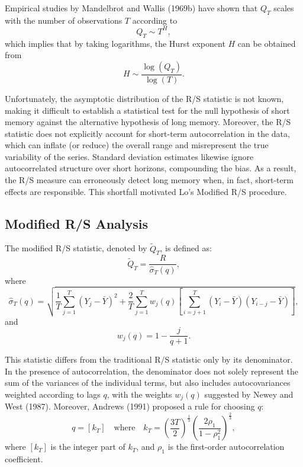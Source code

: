 \documentclass[11pt]{extarticle}
\begin{document}
Empirical studies by Mandelbrot and Wallis (1969b) have shown that \(Q_T\) scales with the number of observations \(T\) according to
\begin{equation}
    Q_T \sim T^H,
\end{equation}
which implies that by taking logarithms, the Hurst exponent \(H\) can be obtained from
\begin{equation}
    H \sim \frac{\log(Q_T)}{\log(T)}.
\end{equation}

Unfortunately, the asymptotic distribution of the R/S statistic is not known, making it difficult to establish a
statistical test for the null hypothesis of short memory against the alternative hypothesis of long memory. Moreover,
the R/S statistic does not explicitly account for short-term autocorrelation in the data, which can inflate (or reduce)
the overall range and misrepresent the true variability of the series. Standard deviation estimates likewise ignore
autocorrelated structure over short horizons, compounding the bias.
As a result, the R/S measure can erroneously detect long memory when, in fact, short-term effects are responsible.
This shortfall motivated Lo’s Modified R/S procedure.

\subsection{Modified R/S Analysis}
\label{sec:modified_rs}

The modified R/S statistic, denoted by \(\tilde{Q}_T\), is defined as:
\begin{equation}
    \tilde{Q}_T = \frac{R}{\hat{\sigma}_T(q)},
\end{equation}
where
\begin{equation}
    \hat{\sigma}_T(q) = \sqrt{\frac{1}{T} \sum_{j=1}^{T} (Y_j - \bar{Y})^2 + \frac{2}{T} \sum_{j=1}^{T} w_j(q) \left[ \sum_{i=j+1}^{T} (Y_i - \bar{Y})(Y_{i-j} - \bar{Y}) \right]},
\end{equation}
and
\begin{equation}
    w_j(q) = 1 - \frac{j}{q + 1}.
\end{equation}

This statistic differs from the traditional R/S statistic only by its denominator. In the presence of autocorrelation,
the denominator does not solely represent the sum of the variances of the individual terms, but also includes
autocovariances weighted according to lags \(q\), with the weights \(w_j(q)\) suggested by Newey and West (1987).
Moreover, Andrews (1991) proposed a rule for choosing \(q\):
\begin{equation}
    q = \left[ k_T \right] \quad \text{where} \quad k_T = \left( \frac{3T}{2} \right)^{\frac{1}{3}} \left( \frac{2 \rho_1}{1 - \rho_1^2} \right)^{\frac{2}{3}},
\end{equation}
where \([k_T]\) is the integer part of \(k_T\), and \(\rho_1\) is the first-order autocorrelation coefficient.
\end{document}
